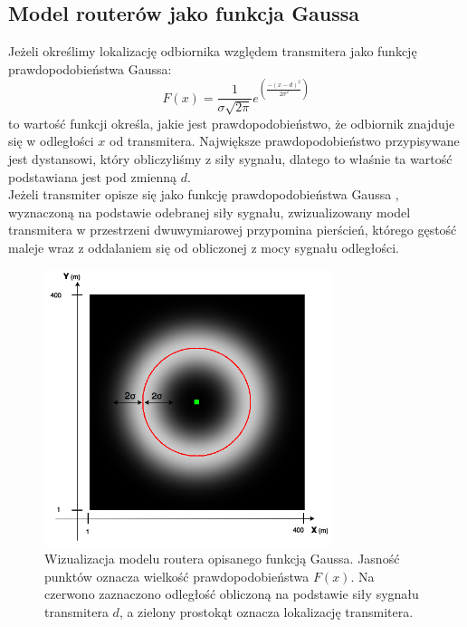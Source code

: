 \subsection{Model routerów jako funkcja Gaussa}
Jeżeli określimy lokalizację odbiornika względem transmitera jako funkcję prawdopodobieństwa Gaussa:
\begin{equation}
F(x) = \frac{1}{\sigma\sqrt{2\pi}}e^{\left(\frac{-(x-d)^2}{2\sigma^2}\right)}
\end{equation}
to wartość funkcji określa, jakie jest prawdopodobieństwo, że odbiornik znajduje się w odległości $x$ od transmitera. Największe prawdopodobieństwo przypisywane jest dystansowi, który obliczyliśmy z siły sygnału, dlatego to właśnie ta wartość podstawiana jest pod zmienną $d$. \cite{JK}\\
Jeżeli transmiter opisze się jako funkcję prawdopodobieństwa Gaussa \cite{YX}, wyznaczoną na podstawie odebranej siły sygnału, zwizualizowany model transmitera w przestrzeni dwuwymiarowej przypomina pierścień, którego gęstość maleje wraz z oddalaniem się od obliczonej z mocy sygnału odległości.
\begin{figure}[H]			
	\centering
	\caption{Wizualizacja modelu routera opisanego funkcją Gaussa. Jasność punktów oznacza wielkość prawdopodobieństwa $F(x)$. Na czerwono zaznaczono odległość obliczoną na podstawie siły sygnału transmitera $d$, a zielony prostokąt oznacza lokalizację transmitera.}
	\includegraphics[width=0.75\textwidth]{router_Gaussa_wizualizacja}
\end{figure}
